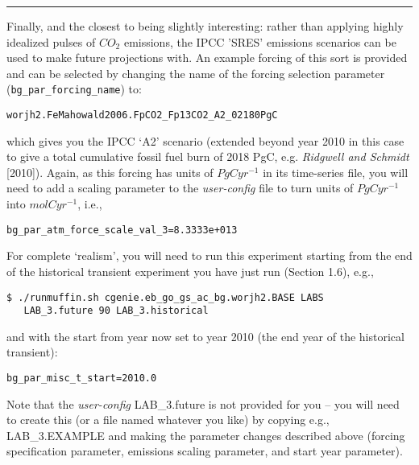 \documentclass[11pt,fleqn]{book} %
\begin{document}
\vspace{1mm}
\noindent\rule{4cm}{0.1mm}
\vspace{2mm}

\noindent Finally, and the closest to being slightly interesting: rather than applying highly idealized pulses  of \(CO_{2}\) emissions, the IPCC 'SRES' emissions scenarios can be used to make future projections with. An example forcing of this sort is provided and can be selected by changing the name of the forcing selection parameter (\texttt{bg\_par\_forcing\_name}) to:
\vspace{-2pt}\begin{verbatim}
worjh2.FeMahowald2006.FpCO2_Fp13CO2_A2_02180PgC
\end{verbatim}\vspace{-2pt}
which gives you the IPCC ‘A2’ scenario (extended beyond year 2010 in this case to give a total cumulative fossil fuel burn of 2018 PgC, e.g. \textit{Ridgwell and Schmidt} [2010]).
Again, as this forcing has units of \(PgCyr^{-1}\) in its time-series file, you will need to add a scaling parameter to the \textit{user-config} file to turn units of \(PgCyr^{-1}\) into \(mol C yr^{-1}\), i.e.,
\vspace{-2pt}\begin{verbatim}
bg_par_atm_force_scale_val_3=8.3333e+013
\end{verbatim}\vspace{-2pt}

For complete ‘realism’, you will need to run this experiment starting from the end of the historical transient experiment you have just run (Section 1.6), e.g.,
\vspace{-2pt}\begin{verbatim}
$ ./runmuffin.sh cgenie.eb_go_gs_ac_bg.worjh2.BASE LABS
   LAB_3.future 90 LAB_3.historical
\end{verbatim}\vspace{-2pt}
and with the start from year now set to year 2010 (the end year of the historical transient):
\vspace{-2pt}\begin{verbatim}
bg_par_misc_t_start=2010.0
\end{verbatim}\vspace{-2pt}
Note that the \textit{user-config} \footnotesize\textsf{LAB\_3.future }\normalsize is not provided for you – you will need to create this (or a file named whatever you like) by copying e.g., \footnotesize\textsf{LAB\_3.EXAMPLE }\normalsize and making the parameter changes described above (forcing specification parameter, emissions scaling parameter, and start year parameter).
\end{document}
